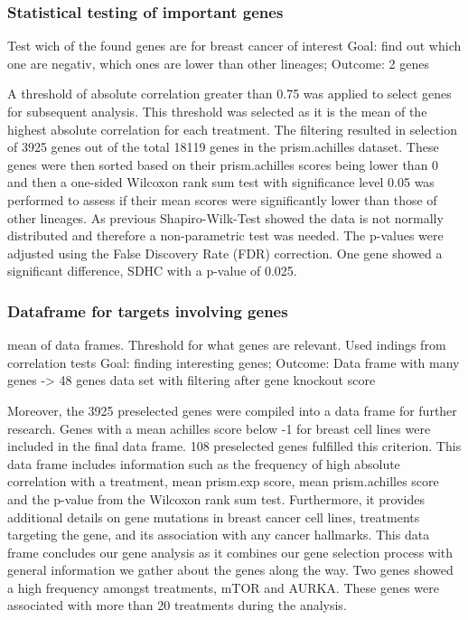 \documentclass[
  11pt,
]{article}
\begin{document}
\hypertarget{statistical-testing-of-important-genes}{%
\subsubsection{Statistical testing of important
genes}\label{statistical-testing-of-important-genes}}

Test wich of the found genes are for breast cancer of interest Goal:
find out which one are negativ, which ones are lower than other
lineages; Outcome: 2 genes

A threshold of absolute correlation greater than 0.75 was applied to
select genes for subsequent analysis. This threshold was selected as it
is the mean of the highest absolute correlation for each treatment. The
filtering resulted in selection of 3925 genes out of the total 18119
genes in the prism.achilles dataset. These genes were then sorted based
on their prism.achilles scores being lower than 0 and then a one-sided
Wilcoxon rank sum test with significance level 0.05 was performed to
assess if their mean scores were significantly lower than those of other
lineages. As previous Shapiro-Wilk-Test showed the data is not normally
distributed and therefore a non-parametric test was needed. The p-values
were adjusted using the False Discovery Rate (FDR) correction. One gene
showed a significant difference, SDHC with a p-value of 0.025.

\hypertarget{dataframe-for-targets-involving-genes}{%
\subsubsection{Dataframe for targets involving
genes}\label{dataframe-for-targets-involving-genes}}

mean of data frames. Threshold for what genes are relevant. Used indings
from correlation tests Goal: finding interesting genes; Outcome: Data
frame with many genes -\textgreater{} 48 genes data set with filtering
after gene knockout score

Moreover, the 3925 preselected genes were compiled into a data frame for
further research. Genes with a mean achilles score below -1 for breast
cell lines were included in the final data frame. 108 preselected genes
fulfilled this criterion. This data frame includes information such as
the frequency of high absolute correlation with a treatment, mean
prism.exp score, mean prism.achilles score and the p-value from the
Wilcoxon rank sum test. Furthermore, it provides additional details on
gene mutations in breast cancer cell lines, treatments targeting the
gene, and its association with any cancer hallmarks. This data frame
concludes our gene analysis as it combines our gene selection process
with general information we gather about the genes along the way. Two
genes showed a high frequency amongst treatments, mTOR and AURKA. These
genes were associated with more than 20 treatments during the analysis.
\end{document}
